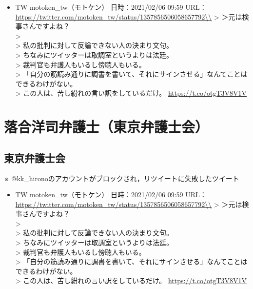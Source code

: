 \documentclass[
]{ltjarticle}
\providecommand{\tightlist}{%
  \setlength{\itemsep}{0pt}\setlength{\parskip}{0pt}}
\begin{document}
\begin{itemize}
\tightlist
\item
  TW motoken\_tw（モトケン） 日時：2021/02/06 09:59 URL：
  \url{https://twitter.com/motoken\_tw/status/1357856506058657792\\} 
  \textgreater{} ＞元は検事さんですよね？\\
  \textgreater{}\\
  \textgreater{} 私の批判に対して反論できない人の決まり文句。\\
  \textgreater{} ちなみにツイッターは取調室というよりは法廷。\\
  \textgreater{} 裁判官も弁護人もいるし傍聴人もいる。\\
  \textgreater{}
  「自分の筋読み通りに調書を書いて、それにサインさせる」なんてことはできるわけがない。\\
  \textgreater{} この人は、苦し紛れの言い訳をしているだけ。
  \url{https://t.co/otgT3V8V1V} 
\end{itemize}

\hypertarget{ux843dux5408ux6d0bux53f8ux5f01ux8b77ux58ebux6771ux4eacux5f01ux8b77ux58ebux4f1a}{%
\section{落合洋司弁護士（東京弁護士会）}\label{ux843dux5408ux6d0bux53f8ux5f01ux8b77ux58ebux6771ux4eacux5f01ux8b77ux58ebux4f1a}}

\hypertarget{ux6771ux4eacux5f01ux8b77ux58ebux4f1a}{%
\subsection{東京弁護士会}\label{ux6771ux4eacux5f01ux8b77ux58ebux4f1a}}

※ @kk\_hironoのアカウントがブロックされ，リツイートに失敗したツイート

\begin{itemize}
\tightlist
\item
  TW motoken\_tw（モトケン） 日時：2021/02/06 09:59 URL：
  \url{https://twitter.com/motoken\_tw/status/1357856506058657792\\} 
  \textgreater{} ＞元は検事さんですよね？\\
  \textgreater{}\\
  \textgreater{} 私の批判に対して反論できない人の決まり文句。\\
  \textgreater{} ちなみにツイッターは取調室というよりは法廷。\\
  \textgreater{} 裁判官も弁護人もいるし傍聴人もいる。\\
  \textgreater{}
  「自分の筋読み通りに調書を書いて、それにサインさせる」なんてことはできるわけがない。\\
  \textgreater{} この人は、苦し紛れの言い訳をしているだけ。
  \url{https://t.co/otgT3V8V1V} 
\end{itemize}
\end{document}
